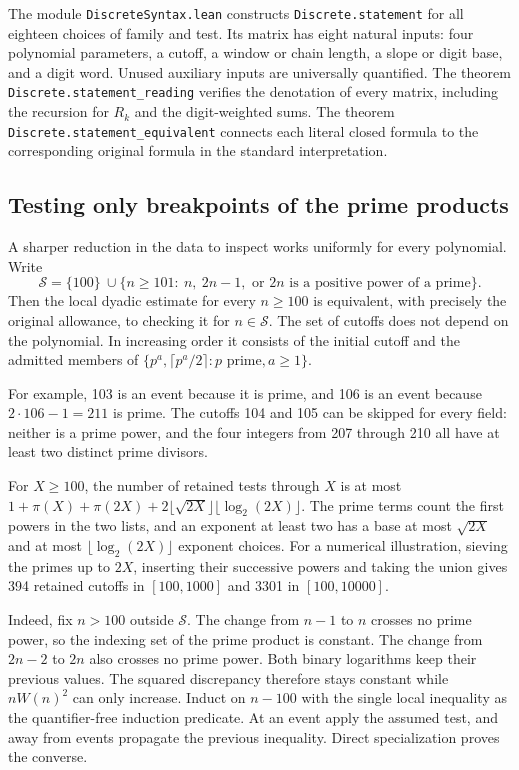 The module \texttt{DiscreteSyntax.lean} constructs \texttt{Discrete.statement} for all eighteen choices of family and test. Its matrix has eight natural inputs: four polynomial parameters, a cutoff, a window or chain length, a slope or digit base, and a digit word. Unused auxiliary inputs are universally quantified. The theorem \texttt{Discrete.statement\_reading} verifies the denotation of every matrix, including the recursion for $R_k$ and the digit-weighted sums. The theorem \texttt{Discrete.statement\_equivalent} connects each literal closed formula to the corresponding original formula in the standard interpretation.

\subsection{Testing only breakpoints of the prime products}
A sharper reduction in the data to inspect works uniformly for every polynomial. Write
\[
 \mathcal S=\{100\}\ \cup \{n\ge101:\ n,\ 2n-1,\text{ or }2n\text{ is a positive power of a prime}\}.
\]
Then the local dyadic estimate for every $n\ge100$ is equivalent, with precisely the original allowance, to checking it for $n\in\mathcal S$. The set of cutoffs does not depend on the polynomial. In increasing order it consists of the initial cutoff and the admitted members of $\{p^a,\lceil p^a/2\rceil:p\text{ prime}, a\ge1\}$.

For example, 103 is an event because it is prime, and 106 is an event because $2\cdot106-1=211$ is prime. The cutoffs 104 and 105 can be skipped for every field: neither is a prime power, and the four integers from 207 through 210 all have at least two distinct prime divisors.

For $X\ge100$, the number of retained tests through $X$ is at most
$1+\pi(X)+\pi(2X)+2\lfloor\sqrt{2X}\rfloor\lfloor\log_2(2X)\rfloor$.
The prime terms count the first powers in the two lists, and an exponent at least two has a base at most $\sqrt{2X}$ and at most $\lfloor\log_2(2X)\rfloor$ exponent choices. For a numerical illustration, sieving the primes up to $2X$, inserting their successive powers and taking the union gives 394 retained cutoffs in $[100,1000]$ and 3301 in $[100,10000]$.

Indeed, fix $n>100$ outside $\mathcal S$. The change from $n-1$ to $n$ crosses no prime power, so the indexing set of the prime product is constant. The change from $2n-2$ to $2n$ also crosses no prime power. Both binary logarithms keep their previous values. The squared discrepancy therefore stays constant while $nW(n)^2$ can only increase. Induct on $n-100$ with the single local inequality as the quantifier-free induction predicate. At an event apply the assumed test, and away from events propagate the previous inequality. Direct specialization proves the converse.

